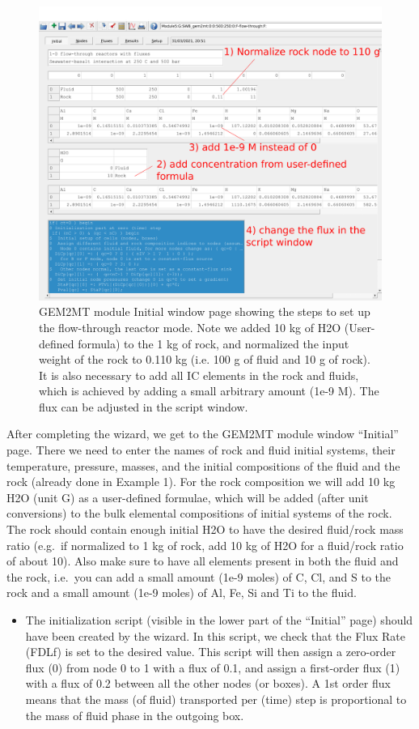 \documentclass[
]{book}
\providecommand{\tightlist}{%
  \setlength{\itemsep}{0pt}\setlength{\parskip}{0pt}}
\begin{document}
\begin{figure}
\includegraphics[width=0.9\linewidth]{figures/module5/fig-4} \caption{GEM2MT module Initial window page showing the steps to set up the flow-through reactor mode. Note we added 10 kg of H2O (User-defined formula) to the 1 kg of rock, and normalized the input weight of the rock to 0.110 kg (i.e. 100 g of fluid and 10 g of rock). It is also necessary to add all IC elements in the rock and fluids, which is achieved by adding a small arbitrary amount (1e-9 M). The flux can be adjusted in the script window.}\label{fig:fig-4e}
\end{figure}

After completing the wizard, we get to the GEM2MT module window ``Initial'' page. There we need to enter the names of rock and fluid initial systems, their temperature, pressure, masses, and the initial compositions of the fluid and the rock (already done in Example 1). For the rock composition we will add 10 kg H2O (unit G) as a user-defined formulae, which will be added (after unit conversions) to the bulk elemental compositions of initial systems of the rock. The rock should contain enough initial H2O to have the desired fluid/rock mass ratio (e.g.~if normalized to 1 kg of rock, add 10 kg of H2O for a fluid/rock ratio of about 10). Also make sure to have all elements present in both the fluid and the rock, i.e.~you can add a small amount (1e-9 moles) of C, Cl, and S to the rock and a small amount (1e-9 moles) of Al, Fe, Si and Ti to the fluid.

\begin{itemize}
\tightlist
\item
  The initialization script (visible in the lower part of the ``Initial'' page) should have been created by the wizard. In this script, we check that the Flux Rate (FDLf) is set to the desired value. This script will then assign a zero-order flux (0) from node 0 to 1 with a flux of 0.1, and assign a first-order flux (1) with a flux of 0.2 between all the other nodes (or boxes). A 1st order flux means that the mass (of fluid) transported per (time) step is proportional to the mass of fluid phase in the outgoing box.
\end{itemize}
\end{document}
